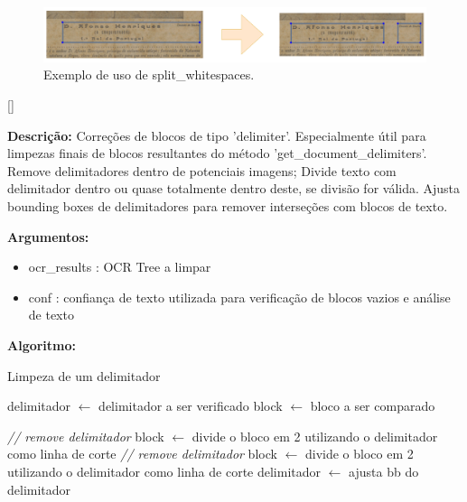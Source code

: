\begin{figure}[H]
	\centering
	\includegraphics[width=1\textwidth]{images/ilustracoes/split_by_whitespaces_blocks.png}
	\caption{Exemplo de uso de split\_whitespaces.}
	\label{fig:split_by_whitespaces_blocks}
\end{figure}




[\normalsize]

\textbf{Descrição:} Correções de blocos de tipo 'delimiter'. Especialmente útil para limpezas finais de blocos resultantes do método 'get\_document\_delimiters'. Remove delimitadores dentro de potenciais imagens; Divide texto com delimitador dentro ou quase totalmente dentro deste, se divisão for válida. Ajusta bounding boxes de delimitadores para remover interseções com blocos de texto.

\textbf{Argumentos:}
\begin{itemize}\setlength\itemsep{-0.3em}
	\vspace{-0.5em}
	\item ocr\_results : OCR Tree a limpar
	\item conf : confiança de texto utilizada para verificação de blocos vazios e análise de texto
\end{itemize}

\textbf{Algoritmo:}

\begin{breakablealgorithm}
	\caption{Limpeza de um delimitador}
	\footnotesize
	\begin{algorithmic}[1]
		\State delimitador $\leftarrow$ delimitador a ser verificado
		\State block $\leftarrow$ bloco a ser comparado
		
				\State \textit{// remove delimitador}
			\Else
					\State block $\leftarrow$ divide o bloco em 2 utilizando o delimitador como linha de corte
				\Else
					\State \textit{// remove delimitador}
				\EndIf
			\EndIf
				\State block $\leftarrow$ divide o bloco em 2 utilizando o delimitador como linha de corte
			\Else
				\State delimitador $\leftarrow$ ajusta bb do delimitador
			\EndIf
		\EndIf
	\end{algorithmic}
\end{breakablealgorithm}


